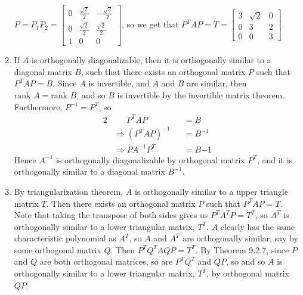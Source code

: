 \documentclass[10pt,english]{article}
\begin{document}
\begin{enumerate}
$P=P_1P_2=\begin{bmatrix}0&\frac{\sqrt{2}}{2}&-\frac{\sqrt{2}}{2}\\0&\frac{\sqrt{2}}{2}&\frac{\sqrt{2}}{2}\\1&0&0\end{bmatrix}$, so we get that $P^TAP=T=\begin{bmatrix}3&\sqrt{2}&0\\0&3&2\\0&0&3\end{bmatrix}$.


\pagebreak
\item If $A$ is orthogonally diagonalizable, then it is orthogonally similar to a diagonal matrix $B$, such that there exists an orthogonal matrix $P$ such that $P^TAP=B$. Since $A$ is invertible, and $A$ and $B$ are similar, then $\text{rank }A=\text{rank }B$, and so $B$ is invertible by the invertible matrix theorem.. Furthermore, $P^{-1}=P^T$, so \begin{alignat*}{2}&\quad\,\,\,P^TAP&&=B\\&\Rightarrow (P^TAP)^{-1}&&=B^{-1}\\&\Rightarrow PA^{-1}P^T&&=B{-1}\end{alignat*} Hence $A^{-1}$ is orthogonally diagonalizable by orthogonal matrix $P^T$, and it is orthogonally similar to a diagonal matrix $B^{-1}$. 


\pagebreak
\item By triangularization theorem, $A$ is orthogonally similar to a upper triangle matrix $T$. Then there exists an orthogonal matrix $P$ such that $P^TAP=T$. Note that taking the transpose of both sides gives us $P^TA^TP=T^T$, so $A^T$ is orthogonally similar to a lower triangular matrix, $T^T$. $A$ clearly has the same characteristic polynomial as $A^T$, so $A$ and $A^T$ are orthogonally similar, say by some orthogonal matrix $Q$. Then $P^TQ^TAQP=T^T$. By Theorem 9.2.7, since $P$ and $Q$ are both orthogonal matrices, so are $P^TQ^T$ and $QP$, so and so $A$ is orthogonally similar to a lower triangular matrix, $T^T$, by orthogonal matrix $QP$. 



\end{enumerate}
\end{document}
